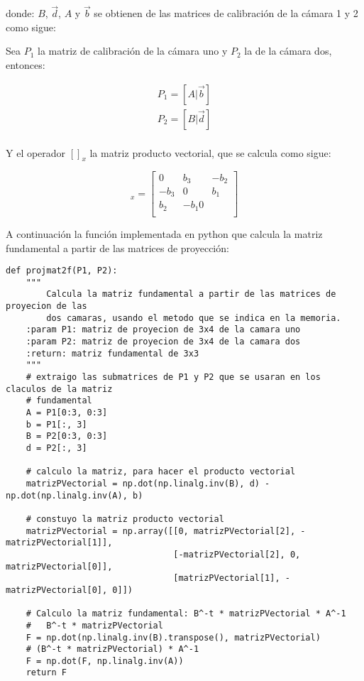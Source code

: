 \documentclass[paper=a4, fontsize=11pt]{scrartcl} %
\numberwithin{equation}{section} %
\numberwithin{figure}{section} %
\numberwithin{table}{section} %
\begin{document}
donde: $B$, $\vec{d}$, $A$ y $\vec{b}$ se obtienen de las matrices de calibración de la cámara 1 y 2 como sigue:

Sea $P_1$ la matriz de calibración de la cámara uno y $P_2$ la de la cámara dos, entonces:

\begin{equation}
	\begin{array}{l}
		P_1 = [A | \vec{b}] \\
		P_2 = [B | \vec{d}]	\\
	\end{array} 
\end{equation}

Y el operador $[]_x$ la matriz producto vectorial, que se calcula como sigue:

\begin{equation}
	[b]_x = \begin{bmatrix}
 				0 & b_3 & -b_2\\
 				-b_3 & 0 & b_1\\
 				b_2 & -b_1 0\\
			\end{bmatrix}
\end{equation}

A continuación la función implementada en python que calcula la matriz fundamental a partir de las matrices de proyección:

\begin{lstlisting}
def projmat2f(P1, P2):
    """
        Calcula la matriz fundamental a partir de las matrices de proyecion de las 
        dos camaras, usando el metodo que se indica en la memoria.
    :param P1: matriz de proyecion de 3x4 de la camara uno
    :param P2: matriz de proyecion de 3x4 de la camara dos
    :return: matriz fundamental de 3x3
    """
    # extraigo las submatrices de P1 y P2 que se usaran en los claculos de la matriz 
    # fundamental
    A = P1[0:3, 0:3]
    b = P1[:, 3]
    B = P2[0:3, 0:3]
    d = P2[:, 3]

    # calculo la matriz, para hacer el producto vectorial
    matrizPVectorial = np.dot(np.linalg.inv(B), d) - np.dot(np.linalg.inv(A), b)

    # constuyo la matriz producto vectorial
    matrizPVectorial = np.array([[0, matrizPVectorial[2], -matrizPVectorial[1]],
                                 [-matrizPVectorial[2], 0, matrizPVectorial[0]],
                                 [matrizPVectorial[1], -matrizPVectorial[0], 0]])

    # Calculo la matriz fundamental: B^-t * matrizPVectorial * A^-1
    #   B^-t * matrizPVectorial
    F = np.dot(np.linalg.inv(B).transpose(), matrizPVectorial)
    # (B^-t * matrizPVectorial) * A^-1
    F = np.dot(F, np.linalg.inv(A))
    return F
\end{lstlisting}
\end{document}
